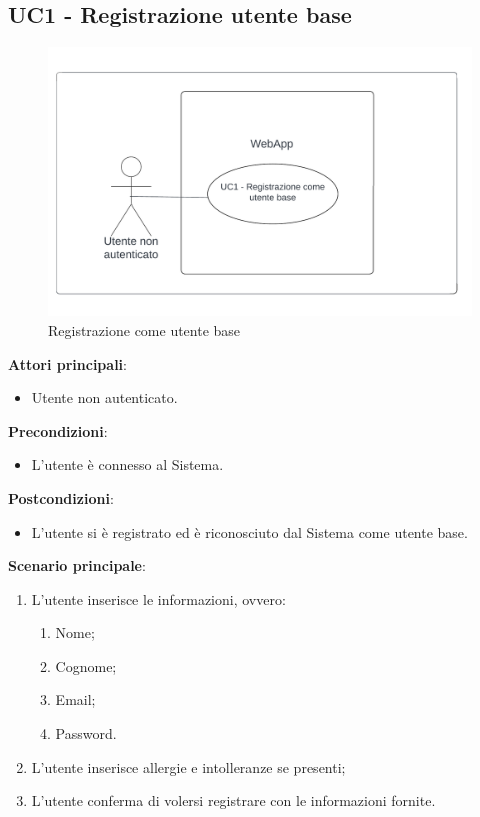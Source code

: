 \subsection{UC1 - Registrazione utente base}\label{usecase:1}
\begin{figure}[H]
  \centering
  \includegraphics[width=0.9\linewidth]{ucd/UCD1_corretto.png}
\caption{Registrazione come utente base}
\end{figure}
\textbf{Attori principali}: 
\begin{itemize}
    \item Utente non autenticato.
\end{itemize}
\textbf{Precondizioni}:
\begin{itemize}
    \item L'utente è connesso al Sistema.
\end{itemize}
\textbf{Postcondizioni}: 
\begin{itemize}
    \item L'utente si è registrato ed è riconosciuto dal Sistema come utente base.
\end{itemize}
\textbf{Scenario principale}:
\begin{enumerate}
    \item L'utente inserisce le informazioni, ovvero:
    \begin{enumerate}
        \item Nome;
        \item Cognome;
        \item Email;
        \item Password.
    \end{enumerate}
    \item L'utente inserisce allergie e intolleranze se presenti;
    \item L'utente conferma di volersi registrare con le informazioni fornite.
\end{enumerate}
